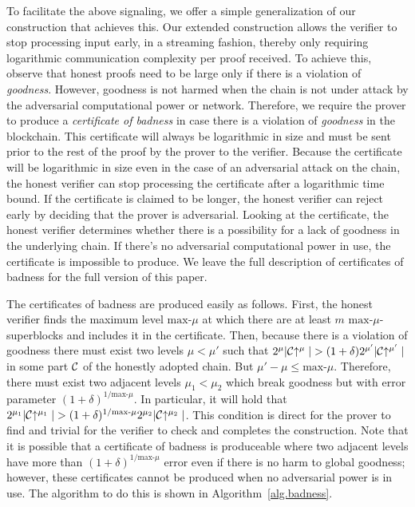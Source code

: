 To facilitate the above signaling, we offer a simple generalization of our
construction that achieves this. Our extended construction allows the verifier
to stop processing input early, in a streaming fashion, thereby only requiring
logarithmic communication complexity per proof received. To achieve this,
observe that honest proofs need to be large only if there is a violation of
\textit{goodness}. However, goodness is not harmed when the chain is not under
attack by the adversarial computational power or network. Therefore, we require
the prover to produce a \textit{certificate of badness} in case there is a
violation of \textit{goodness} in the blockchain. This certificate will always
be logarithmic in size and must be sent prior to the rest of the proof by the
prover to the verifier. Because the certificate will be logarithmic in size even
in the case of an adversarial attack on the chain, the honest verifier can stop
processing the certificate after a logarithmic time bound. If the certificate is
claimed to be longer, the honest verifier can reject early by deciding that the
prover is adversarial. Looking at the certificate, the honest verifier
determines whether there is a possibility for a lack of goodness in the
underlying chain. If there's no adversarial computational power in use, the
certificate is impossible to produce. We leave the full description of
certificates of badness for the full version of this paper.

The certificates of badness are produced easily as follows. First, the honest
verifier finds the maximum level $\text{max-}\mu$ at which there are at least
$m$ $\text{max-}\mu$-superblocks and includes it in the certificate. Then,
because there is a violation of goodness there must exist two levels $\mu <
\mu'$ such that $2^\mu|\mathcal{C}\negthickspace\uparrow^\mu| > (1 +
\delta)2^{\mu'}|\mathcal{C}\negthickspace\uparrow^{\mu'}|$ in some part $\mathcal{C}$ of the honestly
adopted chain. But $\mu' - \mu \leq \text{max-}\mu$. Therefore, there must exist
two adjacent levels $\mu_1 < \mu_2$ which break goodness but with error
parameter $(1 + \delta)^{1/{\text{max-}\mu}}$. In particular, it will hold that
$2^{\mu_1}|\mathcal{C}\negthickspace\uparrow^{\mu_1}| > (1 +
\delta)^{1/{\text{max-}\mu}}2^{\mu_2}|\mathcal{C}\negthickspace\uparrow^{\mu_2}|$. This condition
is direct for the prover to find and trivial for the verifier to check and
completes the construction. Note that it is possible that a certificate of
badness is produceable where two adjacent levels have more than $(1 +
\delta)^{1/{\text{max-}\mu}}$ error even if there is no harm to global goodness;
however, these certificates cannot be produced when no adversarial power is in
use. The algorithm to do this is shown in Algorithm~\ref{alg.badness}.

